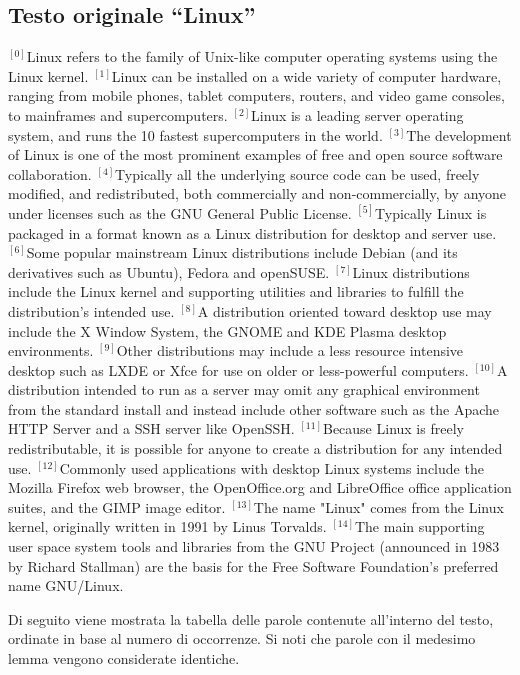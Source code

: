 \begin{small}
\subsection*{Testo originale ``Linux''}
{$^{[0]}$}Linux refers to the family of Unix-like computer operating systems using the Linux kernel. 
{$^{[1]}$}Linux can be installed on a wide variety of computer hardware, ranging from mobile phones, tablet computers, routers, and video game consoles, to mainframes and supercomputers.
{$^{[2]}$}Linux is a leading server operating system, and runs the 10 fastest supercomputers in the world.
{$^{[3]}$}The development of Linux is one of the most prominent examples of free and open source software collaboration.
{$^{[4]}$}Typically all the underlying source code can be used, freely modified, and redistributed, both commercially and non-commercially, by anyone under licenses such as the GNU General Public License. 
{$^{[5]}$}Typically Linux is packaged in a format known as a Linux distribution for desktop and server use. 
{$^{[6]}$}Some popular mainstream Linux distributions include Debian (and its derivatives such as Ubuntu), Fedora and openSUSE. 
{$^{[7]}$}Linux distributions include the Linux kernel and supporting utilities and libraries to fulfill the distribution's intended use.
{$^{[8]}$}A distribution oriented toward desktop use may include the X Window System, the GNOME and KDE Plasma desktop environments. 
{$^{[9]}$}Other distributions may include a less resource intensive desktop such as LXDE or Xfce for use on older or less-powerful computers. 
{$^{[10]}$}A distribution intended to run as a server may omit any graphical environment from the standard install and instead include other software such as the Apache HTTP Server and a SSH server like OpenSSH. 
{$^{[11]}$}Because Linux is freely redistributable, it is possible for anyone to create a distribution for any intended use. 
{$^{[12]}$}Commonly used applications with desktop Linux systems include the Mozilla Firefox web browser, the OpenOffice.org and LibreOffice office application suites, and the GIMP image editor.
{$^{[13]}$}The name "Linux" comes from the Linux kernel, originally written in 1991 by Linus Torvalds. 
{$^{[14]}$}The main supporting user space system tools and libraries from the GNU Project (announced in 1983 by Richard Stallman) are the basis for the Free Software Foundation's preferred name GNU/Linux.
\vfill
\end{small}

\newpage
Di seguito viene mostrata la tabella delle parole contenute all'interno del testo,
ordinate in base al numero di occorrenze.
Si noti che parole con il medesimo lemma vengono considerate identiche.

